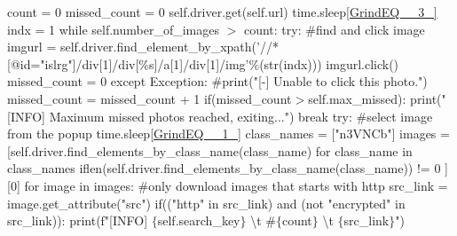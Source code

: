 \documentclass[10pt]{article} %
\begin{document}
\begin{spacing}{1.5}
count = 0   \newline    
missed\_count = 0  \newline
self.driver.get(self.url)   \newline
time.sleep\eqref{GrindEQ__3_}   \newline
indx = 1    \newline
while self.number\_of\_images $\mathrm{>}$ count:   \newline
try:        \newline
\#find and click image          \newline
imgurl = self.driver.find\_element\_by\_xpath('//*[@id="islrg"]/div[1]/div[\%s]/a[1]/div[1]/img'\%(str(indx)))      \newline
imgurl.click() \newline
missed\_count = 0  \newline
except Exception:  \newline
\#print("[-] Unable to click this photo.")      \newline
missed\_count = missed\_count + 1   \newline
if(missed\_count$\mathrm{>}$self.max\_missed):  \newline
print("[INFO] Maximum missed photos reached, exiting...")  \newline
break \newline
try:    \newline
\#select image from the popup  \newline
time.sleep\eqref{GrindEQ__1_} \newline
class\_names = ["n3VNCb"] \newline
images = [self.driver.find\_elements\_by\_class\_name(class\_name)
\newline for class\_name in class\_names if\newline len(self.driver.find\_elements\_by\_class\_name(class\_name)) != 0 ][0] \newline
for image in images:    \newline
\#only download images that starts with http    
\newline
src\_link = image.get\_attribute("src")         \newline
if(("http" in  src\_link) and (not "encrypted" in src\_link)):      \newline
print(f"[INFO] $\mathrm{\{}$self.search\_key$\mathrm{\}}$ {\textbackslash}t \#$\mathrm{\{}$count$\mathrm{\}}$ {\textbackslash}t $\mathrm{\{}$src\_link$\mathrm{\}}$")       \newline

\end{spacing}
\end{document}
